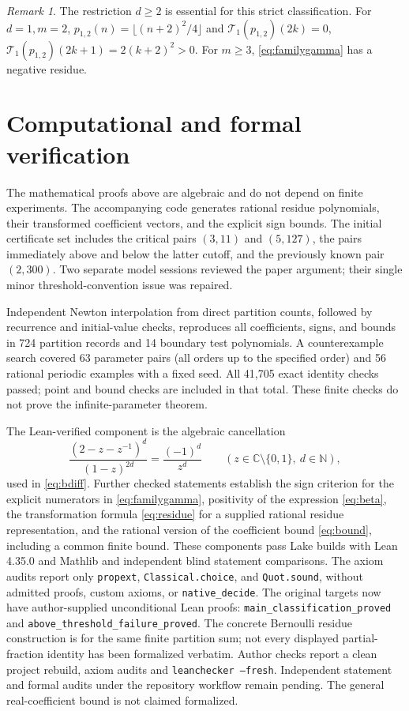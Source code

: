 \documentclass[11pt,reqno]{amsart}
\theoremstyle{remark}
\newtheorem{remark}[theorem]{Remark}
\newcommand{\Lag}{\mathcal{T}}
\newcommand{\NN}{\mathbb{N}}
\newcommand{\CC}{\mathbb{C}}
\begin{document}
\begin{remark}
The restriction \(d\ge2\) is essential for this strict classification.
For \(d=1,m=2\),
\(p_{1,2}(n)=\lfloor(n+2)^2/4\rfloor\) and
\(\Lag_1(p_{1,2})(2k)=0\),
\(\Lag_1(p_{1,2})(2k+1)=2(k+2)^2>0\).
For \(m\ge3\), \eqref{eq:familygamma} has a negative residue.
\end{remark}

\section{Computational and formal verification}

The mathematical proofs above are algebraic and do not depend on finite
experiments. The accompanying code generates rational residue polynomials,
their transformed coefficient vectors, and the explicit sign bounds.
The initial certificate set includes the critical pairs \((3,11)\) and
\((5,127)\), the pairs immediately above and below the latter cutoff,
and the previously known pair \((2,300)\).
Two separate model sessions reviewed the paper argument; their single
minor threshold-convention issue was repaired.

Independent Newton interpolation from direct partition counts, followed by
recurrence and initial-value checks, reproduces all coefficients, signs,
and bounds in 724 partition records and 14 boundary test polynomials.
A counterexample search covered 63 parameter pairs (all orders up to the
specified order) and 56 rational periodic examples with a fixed seed.
All 41,705 exact identity checks passed; point and bound checks are included
in that total. These finite checks do not prove the infinite-parameter theorem.

The Lean-verified component is the algebraic cancellation
\[
 \frac{(2-z-z^{-1})^d}{(1-z)^{2d}}
       =\frac{(-1)^d}{z^d}
 \qquad(z\in\CC\setminus\{0,1\},\ d\in\NN),
\]
used in \eqref{eq:bdiff}. Further checked statements establish the sign criterion
for the explicit numerators in \eqref{eq:familygamma}, positivity of the
expression \eqref{eq:beta}, the transformation formula \eqref{eq:residue}
for a supplied rational residue representation, and the rational version of
the coefficient bound \eqref{eq:bound}, including a common finite bound.
These components pass Lake builds with Lean 4.35.0 and Mathlib and independent
blind statement comparisons. The axiom audits report only \texttt{propext},
\texttt{Classical.choice}, and \texttt{Quot.sound}, without admitted proofs,
custom axioms, or \texttt{native\_decide}.
The original targets now have author-supplied unconditional Lean proofs:
\texttt{main\_classification\_proved} and
\texttt{above\_threshold\_failure\_proved}. The concrete Bernoulli residue
construction is for the same finite partition sum; not every displayed
partial-fraction identity has been formalized verbatim. Author checks report
a clean project rebuild, axiom audits and \texttt{leanchecker --fresh}.
Independent statement and formal audits under the repository workflow remain
pending. The general real-coefficient bound is not claimed formalized.
\end{document}

